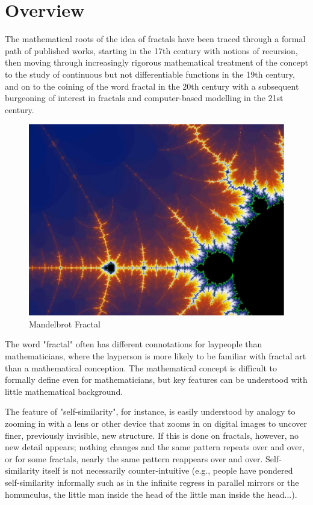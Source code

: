 \documentclass{fisatproject}
\begin{document}
\section{Overview}
The mathematical roots of the idea of fractals have been traced through a formal path of published works, starting in the 17th century with notions of recursion, then moving through increasingly rigorous mathematical treatment of the concept to the study of continuous but not differentiable functions in the 19th century, and on to the coining of the word fractal in the 20th century with a subsequent burgeoning of interest in fractals and computer-based modelling in the 21st century.
\begin{figure}[h!]
\begin{center}
\includegraphics[scale=.2]{mandelbrot}
\caption{Mandelbrot Fractal}
\end{center}
\end{figure}
The word "fractal" often has different connotations for laypeople than mathematicians, where the layperson is more likely to be familiar with fractal art than a mathematical conception. The mathematical concept is difficult to formally define even for mathematicians, but key features can be understood with little mathematical background.

The feature of "self-similarity", for instance, is easily understood by analogy to zooming in with a lens or other device that zooms in on digital images to uncover finer, previously invisible, new structure. If this is done on fractals, however, no new detail appears; nothing changes and the same pattern repeats over and over, or for some fractals, nearly the same pattern reappears over and over. Self-similarity itself is not necessarily counter-intuitive (e.g., people have pondered self-similarity informally such as in the infinite regress in parallel mirrors or the homunculus, the little man inside the head of the little man inside the head...). 
\end{document}

